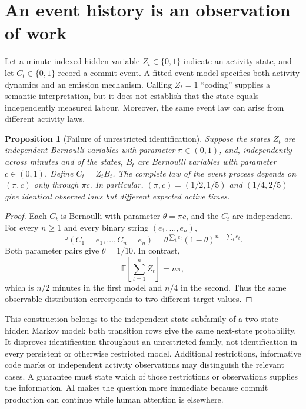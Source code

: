 \documentclass[11pt,a4paper]{amsart}
\newtheorem{proposition}{Proposition}[section]
\theoremstyle{definition}
\theoremstyle{remark}
\newcommand{\E}{\mathbb E}
\newcommand{\Prb}{\mathbb P}
\begin{document}
\section{An event history is an observation of work}
\label{sec:observation}

Let a minute-indexed hidden variable $Z_t\in\{0,1\}$ indicate an activity state, and let $C_t\in\{0,1\}$ record a commit event. A fitted event model specifies both activity dynamics and an emission mechanism. Calling $Z_t=1$ ``coding'' supplies a semantic interpretation, but it does not establish that the state equals independently measured labour. Moreover, the same event law can arise from different activity laws.

\begin{proposition}[Failure of unrestricted identification]
\label{prop:nonidentification}
Suppose the states $Z_t$ are independent Bernoulli variables with parameter $\pi\in(0,1)$, and, independently across minutes and of the states, $B_t$ are Bernoulli variables with parameter $c\in(0,1)$. Define $C_t=Z_tB_t$. The complete law of the event process depends on $(\pi,c)$ only through $\pi c$. In particular, $(\pi,c)=(1/2,1/5)$ and $(1/4,2/5)$ give identical observed laws but different expected active times.
\end{proposition}

\begin{proof}
Each $C_t$ is Bernoulli with parameter $\theta=\pi c$, and the $C_t$ are independent. For every $n\geq1$ and every binary string $(e_1,\ldots,e_n)$,
\begin{equation}
\label{eq:event-law}
 \Prb(C_1=e_1,\ldots,C_n=e_n)
 =\theta^{\sum_t e_t}(1-\theta)^{n-\sum_t e_t}.
\end{equation}
Both parameter pairs give $\theta=1/10$. In contrast,
\begin{equation}
\label{eq:activity-total}
 \E\!\left[\sum_{t=1}^{n}Z_t\right]=n\pi,
\end{equation}
which is $n/2$ minutes in the first model and $n/4$ in the second. Thus the same observable distribution corresponds to two different target values.
\end{proof}

This construction belongs to the independent-state subfamily of a two-state hidden Markov model: both transition rows give the same next-state probability. It disproves identification throughout an unrestricted family, not identification in every persistent or otherwise restricted model. Additional restrictions, informative code marks or independent activity observations may distinguish the relevant cases. A guarantee must state which of those restrictions or observations supplies the information. AI makes the question more immediate because commit production can continue while human attention is elsewhere.
\end{document}
